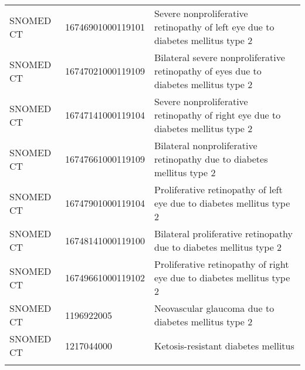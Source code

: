 \begin{longtable}{p{}p{}p{}}
  SNOMED CT & 16746901000119101 & Severe nonproliferative retinopathy of left eye due to diabetes mellitus type 2 \\ 
  SNOMED CT & 16747021000119109 & Bilateral severe nonproliferative retinopathy of eyes due to diabetes mellitus type 2 \\ 
  SNOMED CT & 16747141000119104 & Severe nonproliferative retinopathy of right eye due to diabetes mellitus type 2 \\ 
  SNOMED CT & 16747661000119109 & Bilateral nonproliferative retinopathy due to diabetes mellitus type 2 \\ 
  SNOMED CT & 16747901000119104 & Proliferative retinopathy of left eye due to diabetes mellitus type 2 \\ 
  SNOMED CT & 16748141000119100 & Bilateral proliferative retinopathy due to diabetes mellitus type 2 \\ 
  SNOMED CT & 16749661000119102 & Proliferative retinopathy of right eye due to diabetes mellitus type 2 \\ 
  SNOMED CT & 1196922005 & Neovascular glaucoma due to diabetes mellitus type 2 \\ 
  SNOMED CT & 1217044000 & Ketosis-resistant diabetes mellitus \\ 
  \hline
\label{tab:codes_diabetes}
\end{longtable}
